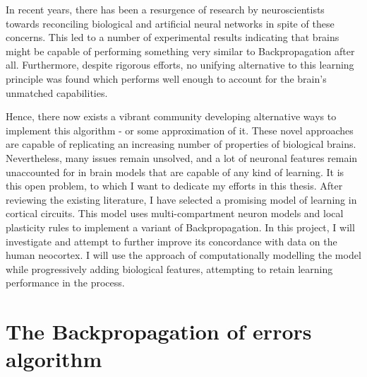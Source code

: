 In recent years, there has been a resurgence of research by neuroscientists towards reconciling biological and
artificial neural networks in spite of these concerns. This led to a number of experimental results indicating that
brains might be capable of performing something very similar to Backpropagation after all. Furthermore, despite rigorous
efforts, no unifying alternative to this learning principle was found which performs well enough to account for the
brain's unmatched capabilities.

Hence, there now exists a vibrant community developing alternative ways to implement this algorithm - or some
approximation of it. These novel approaches are capable of replicating an increasing number of properties of biological
brains. Nevertheless, many issues remain unsolved, and a lot of neuronal features remain unaccounted for in brain models
that are capable of any kind of learning. It is this open problem, to which I want to dedicate my efforts in this
thesis. After reviewing the existing literature, I have selected a promising model of learning in cortical circuits.
This model uses multi-compartment neuron models and local plasticity rules to implement a variant of Backpropagation. In
this project, I will investigate and attempt to further improve its concordance with data on the human neocortex. I will
use the approach of computationally modelling the model while progressively adding biological features, attempting to
retain learning performance in the process.


\section{The Backpropagation of errors algorithm}

